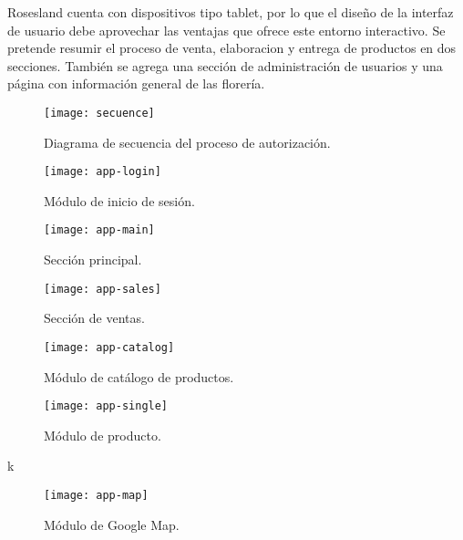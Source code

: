 Rosesland cuenta con dispositivos tipo tablet, por lo que el diseño de la interfaz de usuario debe aprovechar las ventajas que ofrece este entorno interactivo. Se pretende resumir el proceso de venta, elaboracion y entrega de productos en dos secciones. También se agrega una sección de administración de usuarios y una página con información general de las florería.
\vspace{0.8cm}

\begin{figure}[H]
  \centering
  \texttt{[image: secuence]}
  \caption{Diagrama de secuencia del proceso de autorización.}
\end{figure}
\vspace{0.8cm}

\begin{figure}[H]
  \centering
  \texttt{[image: app-login]}
  \caption{Módulo de inicio de sesión.}
\end{figure}
\vspace{0.8cm}

\begin{figure}[H]
  \centering
  \texttt{[image: app-main]}
  \caption{Sección principal.}
\end{figure}
\vspace{0.8cm}

\begin{figure}[H]
  \centering
  \texttt{[image: app-sales]}
  \caption{Sección de ventas.}
\end{figure}
\vspace{0.8cm}

\begin{figure}[H]
  \centering
  \texttt{[image: app-catalog]}
  \caption{Módulo de catálogo de productos.}
\end{figure}
\vspace{0.8cm}

\begin{figure}[H]
  \centering
  \texttt{[image: app-single]}
  \caption{Módulo de producto.}
\end{figure}
\vspace{0.8cm}k

\begin{figure}[H]
  \centering
  \texttt{[image: app-map]}
  \caption{Módulo de Google Map.}
\end{figure}
\vspace{0.8cm}

